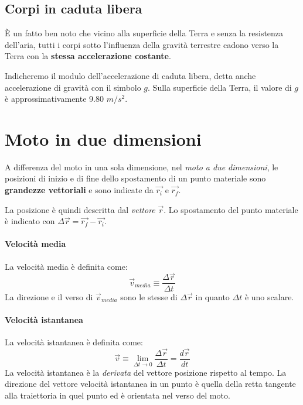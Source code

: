 \documentclass[12pt,oneside]{book}
\begin{document}
\subsection{Corpi in caduta libera}
È un fatto ben noto che vicino alla superficie della Terra e senza la resistenza dell’aria,
tutti i corpi sotto l’influenza della gravità terrestre cadono verso la Terra con la \textbf{stessa accelerazione costante}.

Indicheremo il modulo dell’accelerazione di caduta libera, detta anche accelerazione di gravità con il simbolo $g$.
Sulla superficie della Terra, il valore di $g$ è approssimativamente 9.80 $m/s^2$.

\section{Moto in due dimensioni}
A differenza del moto in una sola dimensione, nel \emph{moto a due dimensioni}, le posizioni di inizio e di fine dello spostamento
di un punto materiale sono \textbf{grandezze vettoriali} e sono indicate da $\vec{r_i}$ e $\vec{r_f}$.

La posizione è quindi descritta dal \emph{vettore} $\vec{r}$. Lo spostamento del punto materiale è indicato con $\Delta \vec{r} = \vec{r_f}-\vec{r_i}$.

\paragraph{Velocità media}
La velocità media è definita come:
\begin{equation*}
    \vec{v}_{media} \equiv \frac{\Delta \vec{r}}{\Delta t}
\end{equation*}
La direzione e il verso di $\vec{v}_{media}$ sono le stesse di $\Delta \vec{r}$ in quanto $\Delta t$ è uno scalare.

\paragraph{Velocità istantanea}
La velocità istantanea è definita come:
\begin{equation*}
    \vec{v} \equiv \lim_{\Delta t \to 0} \frac{\Delta \vec{r}}{\Delta t} = \frac{d \vec{r}}{dt}
\end{equation*}
La velocità istantanea è la \emph{derivata} del vettore posizione rispetto al
tempo. La direzione del vettore velocità istantanea in un punto è quella della retta tangente alla traiettoria in quel punto ed è orientata nel verso del moto.
\end{document}
